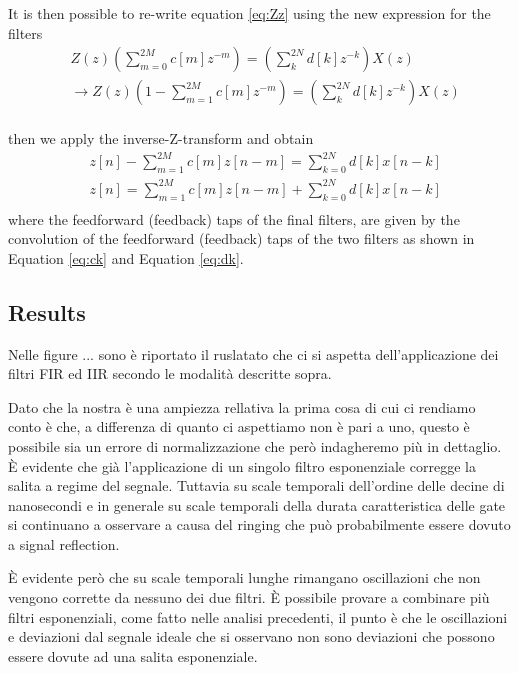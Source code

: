 It is then possible to re-write equation \ref{eq:Zz} using the new expression for the filters
\begin{align}
    & Z(z)\left( \sum_{m=0}^{2M} c[m]z^{-m} \right) = \left( \sum_{k}^{2N} d[k]z^{-k} \right)X(z)\\
    & \rightarrow Z(z)\left(1 - \sum_{m=1}^{2M} c[m]z^{-m} \right) = \left( \sum_{k}^{2N} d[k]z^{-k} \right)X(z)\\ \label{eq:z_final}
\end{align} 

then we apply the inverse-Z-transform and obtain
\begin{align}
    & z[n] - \sum_{m=1}^{2M} c[m]z[n-m] = \sum_{k=0}^{2N} d[k] x[n-k]\\
    & z[n] = \sum_{m=1}^{2M} c[m]z[n-m] + \sum_{k=0}^{2N} d[k] x[n-k]\\
\end{align}
where the feedforward (feedback) taps of the final filters, are given by the convolution of the feedforward (feedback) taps of the two filters as shown in Equation \ref{eq:ck} and Equation \ref{eq:dk}.

\subsection{Results}

Nelle figure ... sono è riportato il ruslatato che ci si aspetta dell'applicazione dei filtri FIR ed IIR secondo le modalità descritte sopra.

Dato che la nostra è una ampiezza rellativa la prima cosa di cui ci rendiamo conto è che, a differenza di quanto ci aspettiamo non è pari a uno, questo è possibile sia un errore di normalizzazione che però indagheremo più in dettaglio.
È evidente che già l'applicazione di un singolo filtro esponenziale corregge la salita a regime del segnale.
Tuttavia su scale temporali dell'ordine delle decine di nanosecondi e in generale su scale temporali della durata caratteristica delle gate si continuano a osservare a causa del ringing che può probabilmente essere dovuto a signal reflection.

È evidente però che su scale temporali lunghe rimangano oscillazioni che non vengono corrette da nessuno dei due filtri.
È possibile provare a combinare più filtri esponenziali, come fatto nelle analisi precedenti, il punto è che le oscillazioni e deviazioni dal segnale ideale che si osservano non sono deviazioni che possono essere dovute ad una salita esponenziale.

